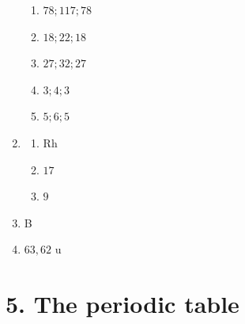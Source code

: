 \begin{multicols}{4}
\begin{enumerate}[noitemsep, label=\textbf{\arabic*}. ]
    \begin{enumerate}[noitemsep, label=\textbf{(\alph*)} ]
    \item $78 ; 117 ; 78$
    \item $18 ; 22 ; 18$
    \item $27 ; 32 ; 27$
    \item $3 ; 4 ; 3$
    \item $5 ; 6 ; 5$
    \end{enumerate}
\item %
  \begin{enumerate}[noitemsep, label=\textbf{(\alph*)} ]
  \item Rh
  \item $17$
  \item $9$
  \end{enumerate}
\item %
B
\item %
$63,62 \text{ u}$
\end{enumerate}
\end{multicols}
\section {5. The periodic table}
